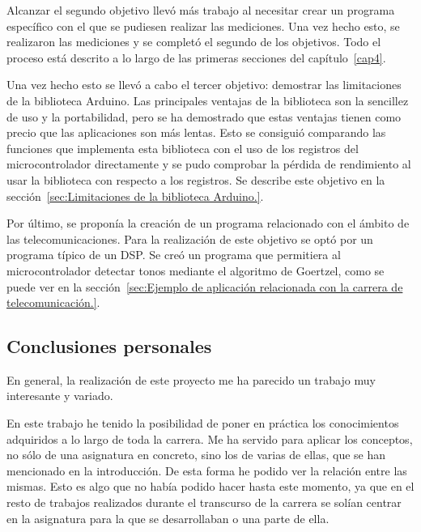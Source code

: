 Alcanzar el segundo objetivo llevó más trabajo al necesitar crear un programa específico con el que se pudiesen realizar las mediciones. Una vez hecho esto, se realizaron las mediciones y se completó el segundo de los objetivos. Todo el proceso está descrito a lo largo de las primeras secciones del capítulo~\ref{cap4}.

Una vez hecho esto se llevó a cabo el tercer objetivo: demostrar las limitaciones de la biblioteca Arduino. Las principales ventajas de la biblioteca son la sencillez de uso y la portabilidad, pero se ha demostrado que estas ventajas tienen como precio que las aplicaciones son más lentas. Esto se consiguió comparando las funciones que implementa esta biblioteca con el uso de los registros del microcontrolador directamente y se pudo comprobar la pérdida de rendimiento al usar la biblioteca con respecto a los registros.  Se describe este objetivo en la sección~\ref{sec:Limitaciones de la biblioteca Arduino.}.

Por último, se proponía la creación de un programa relacionado con el ámbito de las telecomunicaciones. Para la realización de este objetivo se optó por un programa típico de un DSP\@. Se creó un programa que permitiera al microcontrolador detectar tonos mediante el algoritmo de Goertzel, como se puede ver en la sección~\ref{sec:Ejemplo de aplicación relacionada con la carrera de telecomunicación.}.

\subsection{Conclusiones personales}

En general, la realización de este proyecto me ha parecido un trabajo muy interesante y variado.



En este trabajo he tenido la posibilidad de poner en práctica los conocimientos adquiridos a lo largo de toda la carrera. Me ha servido para aplicar los conceptos, no sólo de una asignatura en concreto, sino los de varias de ellas, que se han mencionado en la introducción. De esta forma he podido ver la relación entre las mismas. Esto es algo que no había podido hacer hasta este momento, ya que en el resto 
de trabajos realizados durante el transcurso de la carrera se solían centrar en la asignatura para la que se desarrollaban o una parte de ella.

